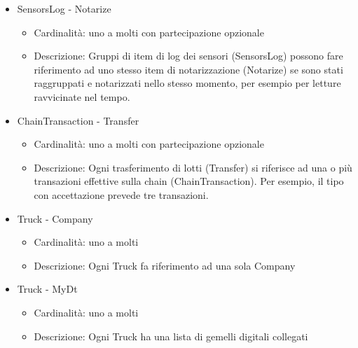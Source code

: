 \documentclass[a4paper,11pt]{article}
\begin{document}
\begin{itemize}
\begin{itemize}
        \end{itemize}
  \item SensorsLog - Notarize
        \begin{itemize}
          \item Cardinalità: uno a molti con partecipazione opzionale
          \item Descrizione: Gruppi di item di log dei sensori (SensorsLog) possono fare riferimento ad uno stesso item di notarizzazione (Notarize) se sono stati raggruppati e notarizzati nello stesso momento, per esempio per letture ravvicinate nel tempo.
        \end{itemize}
  \item ChainTransaction - Transfer
        \begin{itemize}
          \item Cardinalità: uno a molti con partecipazione opzionale
          \item Descrizione: Ogni trasferimento di lotti (Transfer) si riferisce ad una o più transazioni effettive sulla chain (ChainTransaction). Per esempio, il tipo con accettazione prevede tre transazioni.
        \end{itemize}
  \item Truck - Company
        \begin{itemize}
          \item Cardinalità: uno a molti
          \item Descrizione: Ogni Truck fa riferimento ad una sola Company
        \end{itemize}
  \item Truck - MyDt
        \begin{itemize}
          \item Cardinalità: uno a molti
          \item Descrizione: Ogni Truck ha una lista di gemelli digitali collegati
        \end{itemize}
\end{itemize}


\end{document}
